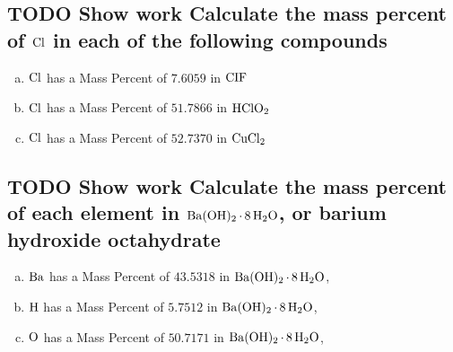 \documentclass[11pt]{article}
\begin{document}
\subsection{{\bfseries\sffamily TODO} Show work Calculate the mass percent of \(\ce{Cl}\) in each of the following compounds}
\label{sec:org9f0a33a}
\begin{enumerate}[(a)]
\item \(\ce{Cl}\)  has a Mass Percent of \(7.6059\) in \(\ce{CIF}\)
\item \(\ce{Cl}\)  has a Mass Percent of \(51.7866\) in \(\ce{HClO2}\)
\item \(\ce{Cl}\)  has a Mass Percent of \(52.7370\) in \(\ce{CuCl2}\)
\end{enumerate}

\subsection{{\bfseries\sffamily TODO} Show work Calculate the mass percent of each element in \(\ce{Ba(OH)2*8H2O}\), or barium hydroxide octahydrate}
\label{sec:orgaf5100a}
\begin{enumerate}[(a)]
\item \(\ce{Ba}\)  has a Mass Percent of \(43.5318\) in \(\ce{Ba(OH)2*8H2O}\),
\item \(\ce{H}\)  has a Mass Percent of \(5.7512\) in \(\ce{Ba(OH)2*8H2O}\),
\item \(\ce{O}\)  has a Mass Percent of \(50.7171\) in \(\ce{Ba(OH)2*8H2O}\),
\end{enumerate}
\end{document}
